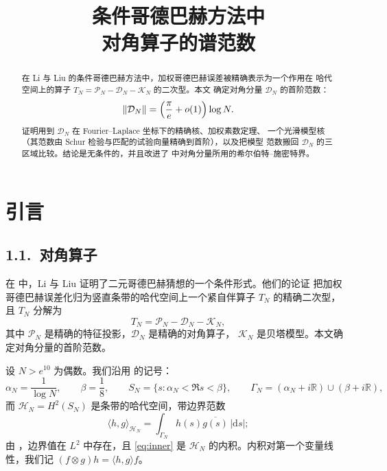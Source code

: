 \documentclass[12pt,a4paper]{amsart}
\numberwithin{equation}{section}
\theoremstyle{plain}
\theoremstyle{definition}
\begin{document}
\title[对角算子的谱范数]{条件哥德巴赫方法中\\ 对角算子的谱范数}

\author{}

\date{}



\begin{abstract}
在 Li 与 Liu 的条件哥德巴赫方法中，加权哥德巴赫误差被精确表示为一个作用在
哈代空间上的算子 $T_N=\mathcal P_N-\mathcal D_N-\mathcal K_N$ 的二次型。本文
确定对角分量 $\mathcal D_N$ 的首阶范数：
\[
 \|\mathcal D_N\|=\Bigl(\frac{\pi}{e}+o(1)\Bigr)\log N .
\]
证明用到 $\mathcal D_N$ 在 Fourier--Laplace 坐标下的精确核、加权素数定理、
一个光滑模型核（其范数由 Schur 检验与匹配的试验向量精确到首阶），以及把模型
范数搬回 $\mathcal D_N$ 的三区域比较。结论是无条件的，并且改进了 \cite{LL}
中对角分量所用的希尔伯特--施密特界。
\end{abstract}

\maketitle

\section{引言}

\subsection*{1.1.\ 对角算子}

在 \cite{LL} 中，Li 与 Liu 证明了二元哥德巴赫猜想的一个条件形式。他们的论证
把加权哥德巴赫误差化归为竖直条带的哈代空间上一个紧自伴算子 $T_N$ 的精确二次型，
且 $T_N$ 分解为
\begin{equation}\label{eq:split}
 T_N=\mathcal P_N-\mathcal D_N-\mathcal K_N,
\end{equation}
其中 $\mathcal P_N$ 是精确的特征投影，$\mathcal D_N$ 是精确的对角算子，
$\mathcal K_N$ 是贝塔模型。本文确定对角分量的首阶范数。

设 $N>e^{10}$ 为偶数。我们沿用 \cite[\S5--6]{LL} 的记号：
\[
 \alpha_N=\frac1{\log N},\qquad \beta=\frac18,\qquad
 S_N=\{s:\alpha_N<\Re s<\beta\},\qquad
 \Gamma_N=(\alpha_N+i\mathbb R)\cup(\beta+i\mathbb R),
\]
而 $\mathcal H_N=H^2(S_N)$ 是条带的哈代空间，带边界范数
\begin{equation}\label{eq:inner}
 \langle h,g\rangle_{\mathcal H_N}
 =\int_{\Gamma_N}h(s)\overline{g(s)}\,|\mathrm ds|;
\end{equation}
由 \cite[引理 5.2]{LL}，边界值在 $L^2$ 中存在，且 \eqref{eq:inner} 是
$\mathcal H_N$ 的内积。内积对第一个变量线性，我们记
$(f\otimes g)h=\langle h,g\rangle f$。
\end{document}
